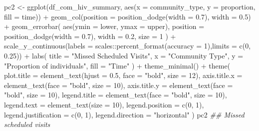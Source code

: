 \documentclass[
  letterpaper,
  DIV=11,
  numbers=noendperiod]{scrartcl}
\newenvironment{Shaded}{\begin{snugshade}}{\end{snugshade}}
\newcommand{\AttributeTok}[1]{\textcolor[rgb]{0.40,0.45,0.13}{#1}}
\newcommand{\DecValTok}[1]{\textcolor[rgb]{0.68,0.00,0.00}{#1}}
\newcommand{\DocumentationTok}[1]{\textcolor[rgb]{0.37,0.37,0.37}{\textit{#1}}}
\newcommand{\FloatTok}[1]{\textcolor[rgb]{0.68,0.00,0.00}{#1}}
\newcommand{\FunctionTok}[1]{\textcolor[rgb]{0.28,0.35,0.67}{#1}}
\newcommand{\NormalTok}[1]{\textcolor[rgb]{0.00,0.23,0.31}{#1}}
\newcommand{\OtherTok}[1]{\textcolor[rgb]{0.00,0.23,0.31}{#1}}
\newcommand{\SpecialCharTok}[1]{\textcolor[rgb]{0.37,0.37,0.37}{#1}}
\newcommand{\StringTok}[1]{\textcolor[rgb]{0.13,0.47,0.30}{#1}}
\begin{document}
\begin{Shaded}
\begin{Highlighting}[]
\NormalTok{pc2 }\OtherTok{\textless{}{-}} \FunctionTok{ggplot}\NormalTok{(df\_com\_hiv\_summary, }\FunctionTok{aes}\NormalTok{(}\AttributeTok{x =}\NormalTok{ community\_type, }\AttributeTok{y =}\NormalTok{ proportion, }\AttributeTok{fill =}\NormalTok{ time)) }\SpecialCharTok{+}
  \FunctionTok{geom\_col}\NormalTok{(}\AttributeTok{position =} \FunctionTok{position\_dodge}\NormalTok{(}\AttributeTok{width =} \FloatTok{0.7}\NormalTok{), }\AttributeTok{width =} \FloatTok{0.5}\NormalTok{) }\SpecialCharTok{+}
  \FunctionTok{geom\_errorbar}\NormalTok{(}
    \FunctionTok{aes}\NormalTok{(}\AttributeTok{ymin =}\NormalTok{ lower, }\AttributeTok{ymax =}\NormalTok{ upper),}
    \AttributeTok{position =} \FunctionTok{position\_dodge}\NormalTok{(}\AttributeTok{width =} \FloatTok{0.7}\NormalTok{),}
    \AttributeTok{width =} \FloatTok{0.2}\NormalTok{,}
    \AttributeTok{size =} \DecValTok{1}
\NormalTok{  ) }\SpecialCharTok{+}
  \FunctionTok{scale\_y\_continuous}\NormalTok{(}\AttributeTok{labels =}\NormalTok{ scales}\SpecialCharTok{::}\FunctionTok{percent\_format}\NormalTok{(}\AttributeTok{accuracy =} \DecValTok{1}\NormalTok{),}\AttributeTok{limits =} \FunctionTok{c}\NormalTok{(}\DecValTok{0}\NormalTok{, }\FloatTok{0.25}\NormalTok{)) }\SpecialCharTok{+}
  \FunctionTok{labs}\NormalTok{(}
    \AttributeTok{title =} \StringTok{"Missed Scheduled Visits"}\NormalTok{,}
    \AttributeTok{x =} \StringTok{"Community Type"}\NormalTok{,}
    \AttributeTok{y =} \StringTok{"Proportion of individuals"}\NormalTok{,}
    \AttributeTok{fill =} \StringTok{"Time"}
\NormalTok{  ) }\SpecialCharTok{+}
  \FunctionTok{theme\_minimal}\NormalTok{() }\SpecialCharTok{+}
  \FunctionTok{theme}\NormalTok{(}
    \AttributeTok{plot.title =} \FunctionTok{element\_text}\NormalTok{(}\AttributeTok{hjust =} \FloatTok{0.5}\NormalTok{, }\AttributeTok{face =} \StringTok{"bold"}\NormalTok{, }\AttributeTok{size =} \DecValTok{12}\NormalTok{),}
    \AttributeTok{axis.title.x =} \FunctionTok{element\_text}\NormalTok{(}\AttributeTok{face =} \StringTok{"bold"}\NormalTok{, }\AttributeTok{size =} \DecValTok{10}\NormalTok{),}
    \AttributeTok{axis.title.y =} \FunctionTok{element\_text}\NormalTok{(}\AttributeTok{face =} \StringTok{"bold"}\NormalTok{, }\AttributeTok{size =} \DecValTok{10}\NormalTok{),}
    \AttributeTok{legend.title =} \FunctionTok{element\_text}\NormalTok{(}\AttributeTok{face =} \StringTok{"bold"}\NormalTok{, }\AttributeTok{size =} \DecValTok{10}\NormalTok{),}
    \AttributeTok{legend.text =} \FunctionTok{element\_text}\NormalTok{(}\AttributeTok{size =} \DecValTok{10}\NormalTok{),}
    \AttributeTok{legend.position =} \FunctionTok{c}\NormalTok{(}\DecValTok{0}\NormalTok{, }\DecValTok{1}\NormalTok{),}
    \AttributeTok{legend.justification =} \FunctionTok{c}\NormalTok{(}\DecValTok{0}\NormalTok{, }\DecValTok{1}\NormalTok{),}
    \AttributeTok{legend.direction =} \StringTok{"horizontal"}
\NormalTok{  )}
\NormalTok{pc2 }\DocumentationTok{\#\# Missed scheduled visits}
\end{Highlighting}
\end{Shaded}
\end{document}
